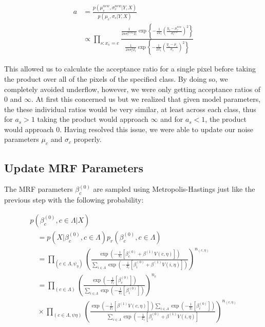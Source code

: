 \documentclass[11pt]{article}
\begin{document}
\begin{equation}
\begin{aligned}
a & = \frac{p\left(\mu_{c}^{new}, \sigma_{c}^{new} | Y, X\right)}{p\left(\mu_{c}, \sigma_{c} | Y, X\right)}\\ & \propto \prod_{s: x_{s}=c}  \frac{\frac{1}{2 \pi \sigma_{c}^{new2} T_{t}} \exp \left\{-\frac{1}{2 T_{t}} \left(\frac{y_{s}-\mu_{c}^{new}}{\sigma_{c}^{new}}\right)^{2} \right\}}{\frac{1}{2 \pi \sigma_{c}^{2} T_{t}} \exp \left\{-\frac{1}{2 T_{t}} \left(\frac{y_{s}-\mu_{c}}{\sigma_{c}}\right)^{2} \right\}}
\end{aligned}
\end{equation}

This allowed us to calculate the acceptance ratio for a single pixel before taking the product over all of the pixels of the specified class.
By doing so, we completely avoided underflow, however, we were only getting acceptance ratios of $0$ and $\infty$.
At first this concerned us but we realized that given model parameters, the these individual ratios would be very similar, at least across each class, thus for $a_{s} > 1$ taking the product would approach $\infty$ and for $a_{s} < 1$, the product would approach 0.
Having resolved this issue, we were able to update our noise parameters $\mu_{c}$ and $\sigma_{c}$ properly.

\subsection{Update MRF Parameters}
The MRF parameters $\beta_{c}^{(0)}$ are sampled using Metropolis-Hastings just like the previous step with the following probability:

\begin{equation}
\begin{array}{l}
p\left(\beta_{c}^{(0)}, c \in \Lambda | X\right) \\
\quad=p\left(X | \beta_{c}^{(0)}, c \in \Lambda\right) p_{r}\left(\beta_{c}^{(0)}, c \in \Lambda\right) \\
\quad=\prod_{\left(c \in \Lambda, \psi_{\eta}\right)}\left(\frac{\exp \left(-\frac{1}{T_{t}}\left[\beta_{c}^{(0)}+\beta^{(1)} V(c, \eta)\right]\right)}{\sum_{i \in \Lambda} \exp \left(-\frac{1}{T_{t}}\left[\beta_{i}^{(0)}+\beta^{(1)} V(i, \eta)\right]\right)}\right)^{n_{(c, \eta)}} \\
\quad=\prod_{(c \in \Lambda)}\left(\frac{\exp \left(-\frac{1}{T_{t}}\left[\beta_{c}^{(0)}\right]\right)}{\sum_{i \in \Lambda} \exp \left(-\frac{1}{T_{t}}\left[\beta_{i}^{(0)}\right]\right)}\right)^{n_{c}} \\
\quad \times \prod_{(c \in \Lambda, \psi \eta)}\left(\frac{\exp \left(-\frac{1}{T_{t}}\left[\beta^{(1)} V(c, \eta)\right]\right) \sum_{i \in \Lambda} \exp \left(-\frac{1}{T_{t}}\left[\beta_{i}^{(0)}\right]\right)}{\sum_{i \in \Lambda} \exp \left(-\frac{1}{T_{t}}\left[\beta_{i}^{(0)}+\beta^{(1)} V(i, \eta)\right]\right.}\right)^{n_{(c, \eta)}}
\end{array}
\end{equation}
\end{document}
